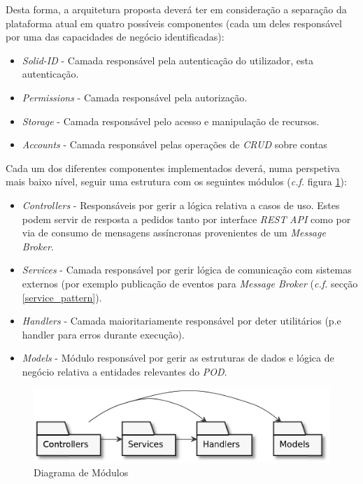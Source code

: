 Desta forma, a arquitetura proposta deverá ter em consideração a separação da plataforma atual em quatro possíveis componentes (cada um deles responsável por uma das capacidades de negócio identificadas):
\begin{itemize}
    \item \emph{Solid-ID} - Camada responsável pela autenticação do utilizador, esta autenticação.
    \item \emph{Permissions} - Camada responsável pela autorização.
    \item \emph{Storage} - Camada responsável pelo acesso e manipulação de recursos.
    \item \emph{Accounts} - Camada responsável pelas operações de \emph{CRUD} sobre contas
\end{itemize}

Cada um dos diferentes componentes implementados deverá, numa perspetiva mais baixo nível, seguir uma estrutura com os seguintes módulos (\emph{c.f.} figura \ref{module_diagram}):

\begin{itemize}
    \item \emph{Controllers} - Responsáveis por gerir a lógica relativa a casos de uso. Estes podem servir de resposta a pedidos tanto por interface \emph{\acrshort{REST}} \emph{API} como por via de consumo de mensagens assíncronas provenientes de um \emph{Message Broker}.
    \item \emph{Services} - Camada responsável por gerir lógica de comunicação com sistemas externos (por exemplo publicação de eventos para \emph{Message Broker} (\emph{c.f.} secção \ref{service_pattern}).
    \item \emph{Handlers} - Camada maioritariamente responsável por deter utilitários (p.e handler para erros durante execução).
    \item \emph{Models} - Módulo responsável por gerir as estruturas de dados e lógica de negócio relativa a entidades relevantes do \emph{\acrshort{POD}}.
    \end{itemize}

\begin{figure}[H]
    \begin{center}
    \includegraphics[width=0.6 \textwidth]{figures/module_diagram.eps}
    \caption{Diagrama de Módulos}
    \label{module_diagram}
    \end{center}
\end{figure} 


